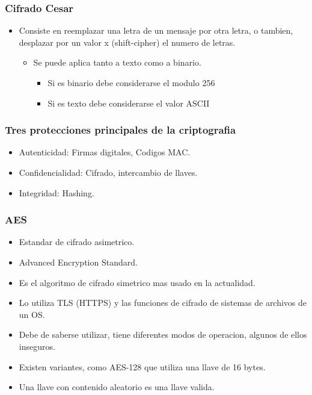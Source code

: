 \documentclass[11pt]{article}
\begin{document}
\subsubsection{Cifrado Cesar}
\label{sec:orgb95a766}
\begin{itemize}
\item Consiste en reemplazar una letra de un mensaje por otra letra, o tambien, desplazar por un valor x (shift-cipher) el numero de letras.
\begin{itemize}
\item Se puede aplica tanto a texto como a binario.
\begin{itemize}
\item Si es binario debe considerarse el modulo 256
\item Si es texto debe considerarse el valor ASCII
\end{itemize}
\end{itemize}
\end{itemize}
\subsubsection{Tres protecciones principales de la criptografia}
\label{sec:org67eeb70}
\begin{itemize}
\item Autenticidad: Firmas digitales, Codigos MAC.
\item Confidencialidad: Cifrado, intercambio de llaves.
\item Integridad: Hashing.
\end{itemize}
\subsubsection{AES}
\label{sec:org0c4da08}
\begin{itemize}
\item Estandar de cifrado asimetrico.
\item Advanced Encryption Standard.
\item Es el algoritmo de cifrado simetrico mas usado en la actualidad.
\item Lo utiliza TLS (HTTPS) y las funciones de cifrado de sistemas de archivos de un OS.
\item Debe de saberse utilizar, tiene diferentes modos de operacion, algunos de ellos inseguros.
\item Existen variantes, como AES-128 que utiliza una llave de 16 bytes.
\item Una llave con contenido aleatorio es una llave valida.
\end{itemize}
\end{document}
